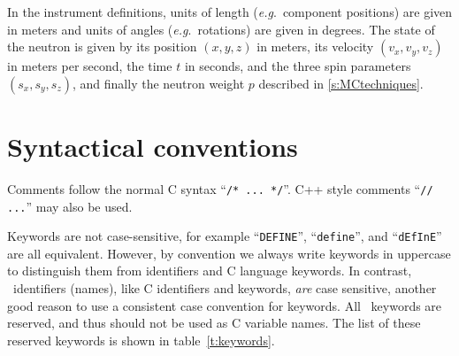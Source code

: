 In the instrument definitions, units of length (\textit{e.g}.\ component
positions) are given in meters and units of angles (\textit{e.g}.\
rotations) are given in degrees.  The state of the neutron is given by
its position $(x,y,z)$ in meters, its velocity $(v_x, v_y, v_z)$ in
meters per second, the time $t$ in seconds, and the three spin parameters
$\left( s_x, s_y, s_z \right)$, and finally the neutron weight $p$ described in \ref{s:MCtechniques}.

\section{Syntactical conventions}
\label{s:syntax}

Comments follow the normal C syntax ``\verb+/* ... */+''. C++ style
comments ``\verb+// ...+'' may also be used.


Keywords are not case-sensitive, for example ``\verb+DEFINE+'',
``\verb+define+'', and ``\verb+dEfInE+'' are all equivalent. However, by
convention we always write keywords in uppercase to distinguish them
from identifiers and C language keywords. In contrast, \MCS\
identifiers (names), like C identifiers and keywords, \emph{are} case
sensitive, another good reason to use a consistent case convention for
keywords. All \MCS\ keywords are reserved, and thus should not be used
as C variable names. The list of these reserved keywords is shown in table~\ref{t:keywords}. 

